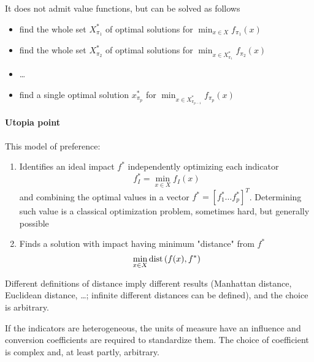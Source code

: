 It does not admit value functions, but can be solved as follows
\begin{itemize}
	\item find the whole set $X^\ast_{\pi_1}$ of optimal solutions for $\min_{x \in X} f_{\pi_1}(x)$
	
	\item find the whole set $X^\ast_{\pi_2}$ of optimal solutions for $\min_{x \in X^\ast_{\pi_1}} f_{\pi_2}(x)$
	
	\item \dots
	
	\item find a single optimal solution $x^\ast_{\pi_p}$ for $\min_{x \in X^\ast_{\pi_{p-1}}} f_{\pi_p}(x)$
\end{itemize}

\paragraph{Utopia point} This model of preference:
\begin{enumerate}
	\item Identifies an ideal impact $f^\ast$ independently optimizing each indicator
	$$ f_I^\ast = \min_{x \in X} f_I (x) $$
	and combining the optimal values in a vector $f^\ast = \left[f_1^\ast \dots f_p^\ast \right]^T$. Determining such value is a classical optimization problem, sometimes hard, but generally possible
	
	\item Finds a solution with impact having minimum "distance" from $f^\ast$
	$$ \min_{x \in X} \text{dist} \left(f(x), f^\ast \right)$$
\end{enumerate}

Different definitions of distance imply different results (Manhattan distance, Euclidean distance, \dots; infinite different distances can be defined), and the choice is arbitrary. 

If the indicators are heterogeneous, the units of measure have an influence and conversion coefficients are required to standardize them. The choice of coefficient is complex and, at least partly, arbitrary.

